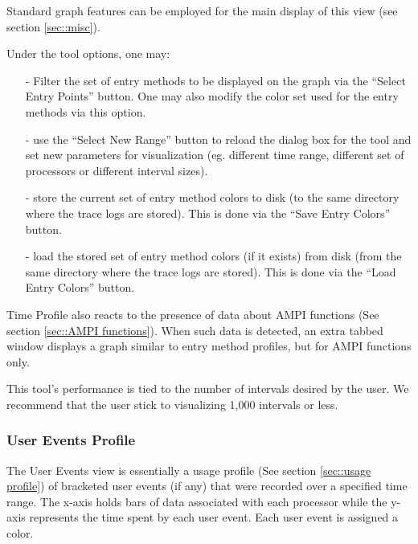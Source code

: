 \documentclass[10pt]{article}
\begin{document}
Standard graph features can be employed for the main display of this
view (see section \ref{sec::misc}).

Under the tool options, one may:

\begin{itemize}
\item[-] Filter the set of entry methods to be displayed on the graph via
the ``Select Entry Points'' button. One may also modify the color set used
for the entry methods via this option.
\item[-] use the ``Select New Range'' button to reload the dialog box
for the tool and set new parameters for visualization (eg. different
time range, different set of processors or different interval sizes).
\item[-] store the current set of entry method colors to disk (to the
same directory where the trace logs are stored). This is done via the
``Save Entry Colors'' button.
\item[-] load the stored set of entry method colors (if it exists)
from disk (from the same directory where the trace logs are
stored). This is done via the ``Load Entry Colors'' button.
\end{itemize}

Time Profile also reacts to the presence of data about AMPI
functions (See section \ref{sec::AMPI functions}). When such data is
detected, an extra tabbed window displays a graph similar to entry
method profiles, but for AMPI functions only.

This tool's performance is tied to the number of intervals desired by
the user. We recommend that the user stick to visualizing 1,000
intervals or less.

\subsubsection{User Events Profile}

The User Events view is essentially a usage profile (See section
\ref{sec::usage profile}) of bracketed user events (if any) that were
recorded over a specified time range. The x-axis holds bars of data
associated with each processor while the y-axis represents the time
spent by each user event. Each user event is assigned a color.
\end{document}
